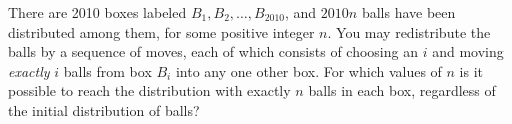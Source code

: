 There are 2010 boxes labeled $B_1, B_2, \dots, B_{2010}$, and $2010n$ balls have been distributed
among them, for some positive integer $n$. You may redistribute the balls by a sequence of moves,
each of which consists of choosing an $i$ and moving \emph{exactly} $i$ balls from box $B_i$ into any
one other box. For which values of $n$ is it possible to reach the distribution with exactly $n$ balls
in each box, regardless of the initial distribution of balls?
\medskip
